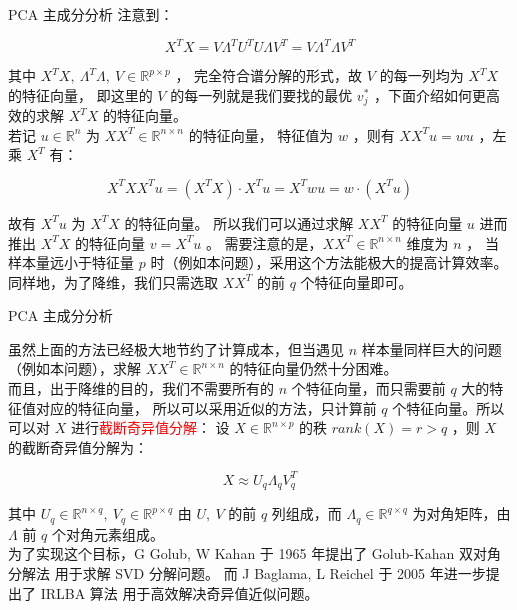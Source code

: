 \documentclass[11pt]{beamer}
\begin{document}
\begin{frame}{PCA 主成分分析}{}
\fontsize{9pt}{11pt}\selectfont
注意到：

$$
X^TX = V\Lambda^T U^TU\Lambda V^T = V\Lambda^T \Lambda V^T
$$

其中 $X^TX,\ \Lambda^T\Lambda,\ V \in \mathbb{R}^{p\times p}$ ，
完全符合谱分解的形式，故 $V$ 的每一列均为 $X^TX$ 的特征向量，
即这里的 $V$ 的每一列就是我们要找的最优 $v_j^*$ ，下面介绍如何更高效的求解 $X^TX$ 的特征向量。\\[0.5em]

若记 $u \in \mathbb{R}^n$ 为 $XX^T \in \mathbb{R}^{n\times n}$ 的特征向量，
特征值为 $w$ ，则有 $XX^T u = wu$ ，左乘 $X^T$ 有：

$$
X^TXX^Tu = (X^TX) \cdot X^Tu = X^T wu = w \cdot (X^Tu)
$$

故有 $X^Tu$ 为 $X^TX$ 的特征向量。
所以我们可以通过求解 $XX^T$ 的特征向量 $u$ 进而推出 $X^TX$ 的特征向量 $v = X^Tu$ 。
需要注意的是，$XX^T \in \mathbb{R}^{n \times n}$ 维度为 $n$ ，
当样本量远小于特征量 $p$ 时（例如本问题），采用这个方法能极大的提高计算效率。同样地，为了降维，我们只需选取 $XX^T$ 的前 $q$ 个特征向量即可。

\end{frame}


\begin{frame}{PCA 主成分分析}{}
\fontsize{9pt}{11pt}\selectfont

虽然上面的方法已经极大地节约了计算成本，但当遇见 $n$ 样本量同样巨大的问题
（例如本问题），求解 $XX^T \in \mathbb{R}^{n \times n}$ 的特征向量仍然十分困难。\\[0.5em]

而且，出于降维的目的，我们不需要所有的 $n$ 个特征向量，而只需要前 $q$ 大的特征值对应的特征向量，
所以可以采用近似的方法，只计算前 $q$ 个特征向量。所以可以对 $X$ 进行\textcolor{red}{截断奇异值分解}：
设 $X \in \mathbb{R}^{n \times p}$ 的秩 $rank(X) = r > q$ ，则 $X$ 的截断奇异值分解为：

$$
X \approx U_q \Lambda_q V_q^T
$$

其中 $U_q \in \mathbb{R}^{n \times q},\ V_q \in \mathbb{R}^{p \times q}$ 
由 $U,\ V$ 的前 $q$ 列组成，而 $\Lambda_q \in \mathbb{R}^{q \times q}$ 
为对角矩阵，由 $\Lambda$ 前 $q$ 个对角元素组成。\\[0.5em]

为了实现这个目标，G Golub, W Kahan 于 1965 年提出了 Golub-Kahan 双对角分解法 \cite{golub1965svd} 用于求解 SVD 分解问题。
而 J Baglama, L Reichel 于 2005 年进一步提出了 IRLBA 算法 \cite{baglama2005lanczos} 用于高效解决奇异值近似问题。

\end{frame}
\end{document}
